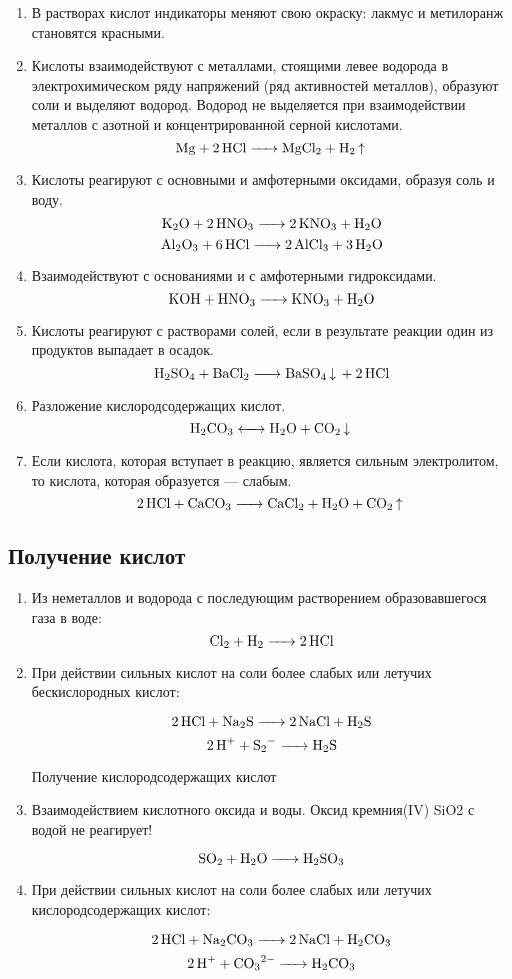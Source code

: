\begin{enumerate}
    \item В растворах кислот индикаторы меняют свою окраску: лакмус и метилоранж
        становятся красными.
    \item Кислоты взаимодействуют с металлами, стоящими левее водорода в
        электрохимическом ряду напряжений (ряд активностей металлов), образуют
        соли и выделяют водород. Водород не выделяется при взаимодействии металлов
        с азотной и концентрированной серной кислотами.
        $$\ce{Mg + 2HCl -> MgCl2 + H2 ^}$$
    \item Кислоты реагируют с основными и амфотерными оксидами, образуя соль и
        воду.
        $$\ce{K2O + 2HNO3 -> 2KNO3 + H2O}$$
        $$\ce{Al2O3 + 6HCl -> 2AlCl3 + 3H2O}$$
    \item Взаимодействуют с основаниями и с амфотерными гидроксидами.
        $$\ce{KOH + HNO3 -> KNO3 + H2O}$$
    \item Кислоты реагируют с растворами солей, если в результате реакции один из
        продуктов выпадает в осадок.
        $$\ce{H2SO4 + BaCl2 -> BaSO4 v + 2HCl}$$
    \item Разложение кислородсодержащих кислот.
        $$\ce{H2CO3 <-> H2O + CO2 v}$$
    \item Если кислота, которая вступает в реакцию, является сильным электролитом, то
        кислота, которая образуется — слабым.
        $$\ce{2HCl + CaCO3 -> CaCl2 + H2O + CO2 ^}$$
\end{enumerate}

\subsection{Получение кислот}

\begin{enumerate}
    \item   Из неметаллов и водорода с последующим растворением образовавшегося газа в воде:
        $$\ce{Cl2 + H2 -> 2HCl}$$
    \item При действии сильных кислот на соли более слабых или летучих бескислородных кислот:

        $$\ce{2HCl + Na2S -> 2NaCl + H2S}$$
        $$\ce{2H+ + S2- -> H2S}$$

        Получение кислородсодержащих кислот

    \item Взаимодействием кислотного оксида и воды. Оксид кремния(IV) SiO2 с водой не реагирует!

        $$\ce{SO2 + H2O -> H2SO3}$$
    \item При действии сильных кислот на соли более слабых или летучих кислородсодержащих кислот:

        $$\ce{2HCl + Na2CO3 -> 2NaCl + H2CO3}$$
        $$\ce{2H+ + CO3^2- -> H2CO3}$$
\end{enumerate}

